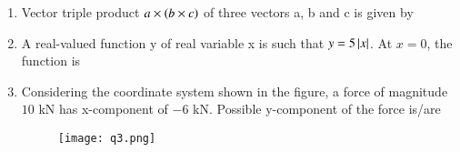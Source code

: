 \documentclass[journal,12pt,onecolumn]{IEEEtran}
\theoremstyle{remark}
\begin{document}
\begin{enumerate}
\item Vector triple product $a \times \left(b \times c\right)$ of three vectors a, b and c is given by

\hfill{}

\begin{enumerate}
\end{enumerate}

\item A real-valued function y of real variable x is such that $y=5\left\vert x\right\vert$. At $x=0$, the function is

\hfill{}

\begin{enumerate}
\end{enumerate}

\item Considering the coordinate system shown in the figure, a force of magnitude $10$ kN has x-component of $-6$ kN. Possible y-component of the force is/are
\begin{figure}[h]
    \centering
    \texttt{[image: q3.png]}
    \caption*{}
    \label{fig:q3}
\end{figure}

\hfill{}

\begin{enumerate}
\end{enumerate}


\end{enumerate}
\end{document}

